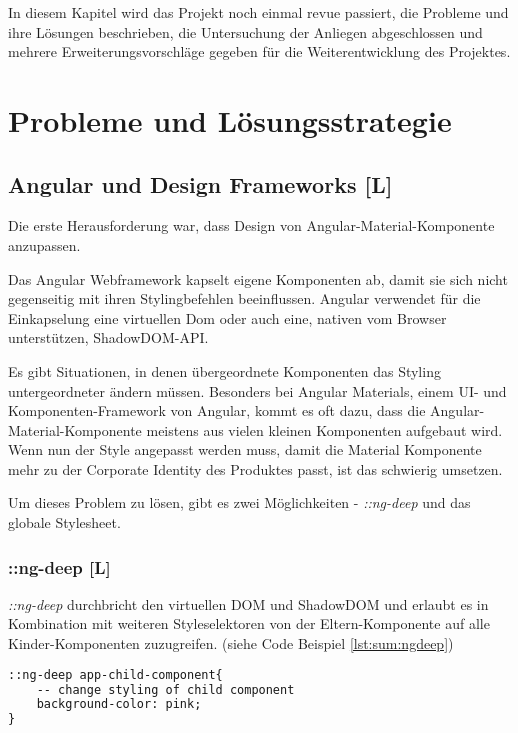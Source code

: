In diesem Kapitel wird das Projekt noch einmal revue passiert, die Probleme und ihre Lösungen beschrieben, die Untersuchung der Anliegen abgeschlossen und mehrere Erweiterungsvorschläge gegeben für die Weiterentwicklung des Projektes.

\section{Probleme und Lösungsstrategie}
\subsection{Angular und Design Frameworks [L]}
Die erste Herausforderung war, dass Design von Angular-Material-Komponente anzupassen.

Das Angular Webframework kapselt eigene Komponenten ab, damit sie sich nicht gegenseitig mit ihren Stylingbefehlen beeinflussen. Angular verwendet für die Einkapselung eine virtuellen Dom oder auch eine, nativen vom Browser unterstützen, ShadowDOM-API.
\cite{AngularViewencapsulation}

Es gibt Situationen, in denen übergeordnete Komponenten das Styling untergeordneter ändern müssen. Besonders bei Angular Materials, einem UI- und Komponenten-Framework von Angular, kommt es oft dazu, dass die Angular-Material-Komponente meistens aus vielen kleinen Komponenten aufgebaut wird. Wenn nun der Style angepasst werden muss, damit die Material Komponente mehr zu der Corporate Identity des Produktes passt, ist das schwierig umsetzen.

Um dieses Problem zu lösen, gibt es zwei Möglichkeiten - \emph{::ng-deep} und das globale Stylesheet.

\subsubsection{::ng-deep [L]}
\emph{::ng-deep} durchbricht den virtuellen DOM und ShadowDOM und erlaubt es in Kombination mit weiteren Styleselektoren von der Eltern-Komponente auf alle Kinder-Komponenten zuzugreifen. (siehe Code Beispiel \ref{lst:sum:ngdeep})

\begin{lstlisting}[caption={{Parent.component.scss - Changing Styling in Child Componentes by using :ngdeep}},language=HTML,label=lst:sum:ngdeep]
::ng-deep app-child-component{
    -- change styling of child component
    background-color: pink;
}    
\end{lstlisting}

